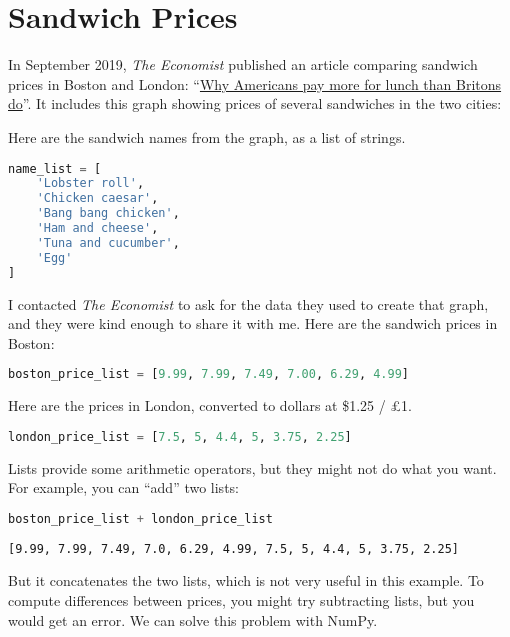 \hypertarget{sandwich-prices}{%
\section{Sandwich Prices}\label{sandwich-prices}}

In September 2019, \emph{The Economist} published an article comparing
sandwich prices in Boston and London:
``\href{https://www.economist.com/finance-and-economics/2019/09/07/why-americans-pay-more-for-lunch-than-britons-do}{Why
Americans pay more for lunch than Britons do}''. It includes this graph
showing prices of several sandwiches in the two cities:

Here are the sandwich names from the graph, as a list of strings.

\begin{lstlisting}[language=Python,style=source]
name_list = [
    'Lobster roll',
    'Chicken caesar',
    'Bang bang chicken',
    'Ham and cheese',
    'Tuna and cucumber',
    'Egg'
]
\end{lstlisting}

I contacted \emph{The Economist} to ask for the data they used to create
that graph, and they were kind enough to share it with me. Here are the
sandwich prices in Boston:

\begin{lstlisting}[language=Python,style=source]
boston_price_list = [9.99, 7.99, 7.49, 7.00, 6.29, 4.99]
\end{lstlisting}

Here are the prices in London, converted to dollars at \$1.25 / £1.

\begin{lstlisting}[language=Python,style=source]
london_price_list = [7.5, 5, 4.4, 5, 3.75, 2.25]
\end{lstlisting}

Lists provide some arithmetic operators, but they might not do what you
want. For example, you can ``add'' two lists:

\begin{lstlisting}[language=Python,style=source]
boston_price_list + london_price_list
\end{lstlisting}

\begin{lstlisting}[style=output]
[9.99, 7.99, 7.49, 7.0, 6.29, 4.99, 7.5, 5, 4.4, 5, 3.75, 2.25]
\end{lstlisting}

But it concatenates the two lists, which is not very useful in this
example. To compute differences between prices, you might try
subtracting lists, but you would get an error. We can solve this problem
with NumPy.

